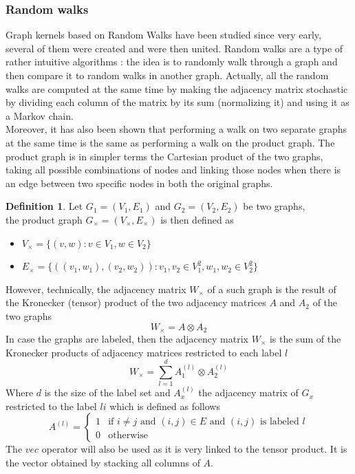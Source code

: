 \documentclass{article}
\theoremstyle{definition}
\newtheorem{definition}{Definition}
\begin{document}
\subsubsection{Random walks}
Graph kernels based on Random Walks have been studied since very early\cite{kashima_graphkers_2003}, several of them were created and were then united\cite{vishwanathan_graph_2010}. Random walks are a type of rather intuitive algorithms : the idea is to randomly walk through a graph and then compare it to random walks in another graph. Actually, all the random walks are computed at the same time by making the adjacency matrix stochastic by dividing each column of the matrix by its sum (normalizing it) and using it as a Markov chain.\\
Moreover, it has also been shown\cite{imrich2000product} that performing a walk on two separate graphs at the same time is the same as performing a walk on the product graph. The product graph is in simpler terms the Cartesian product of the two graphs, taking all possible combinations of nodes and linking those nodes when there is an edge between two specific nodes in both the original graphs. \\
\begin{definition}
	Let $G_1=(V_{1},E_{1})$ and $G_2=(V_{2},E_{2})$ be two graphs,\\the product graph
	$G_\times = (V_{\times},E_{\times})$ is then defined as
	\begin{itemize}
		\item $V_{\times} = \{(v,w) : v \in V_{1}, w \in V_{2} \}$
		\item $E_{\times} = \{((v_1,w_1),(v_2,w_2)) : v_1,v_2 \in V_{1}^2, w_1,w_2 \in V_{2}^2 \}$
	\end{itemize}
\end{definition}

However, technically, the adjacency matrix $W_{\times}$ of a such graph is the result of the Kronecker (tensor) product of the two adjacency matrices $A$ and $A_2$ of the two graphs \cite{weichsel1962kronecker}
\begin{equation}
    W_{\times}=A \otimes A_{2}
\end{equation}
In case the graphs are labeled, then the adjacency matrix $W_{\times}$ is the sum of the Kronecker products of adjacency matrices restricted to each label $l$ 
\begin{equation}
	W_{\times}=\sum\limits_{l=1}^{d} A_1^{(l)} \otimes A_2^{(l)}
\end{equation}
Where $d$ is the size of the label set and $A_x^{(l)}$ the adjacency matrix of $G_x$ restricted to the label $li$ which is defined as follows
\begin{equation}
	A^{(l)}=\left\{
		\begin{matrix}
		1 & \mbox{if } i \neq j \mbox{ and } (i,j) \in E \mbox{ and } (i,j) \mbox{ is labeled } l\\
		0 & \mbox{otherwise}
		\end{matrix}
		\right.
\end{equation}
The $vec$ operator will also be used as it is very linked to the tensor product. It is the vector obtained by stacking all columns of $A$.
\end{document}
